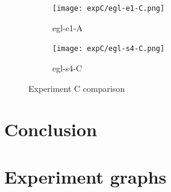 \documentclass[twoside]{ctuthesis}
\theoremstyle{plain}
\theoremstyle{definition}
\theoremstyle{note}
\begin{document}
\begin{figure}[htbp]
	\label{f:fff}
	\centering
	\begin{subfigure}{0.49\textwidth}
		\centering
		\texttt{[image: expC/egl-e1-C.png]}
		\caption{egl-e1-A}
	\end{subfigure}
	\hfill
	\begin{subfigure}{0.49\textwidth}
		
		\centering
		\texttt{[image: expC/egl-s4-C.png]}
		\caption{egl-s4-C}
	\end{subfigure}
	\caption{Experiment C comparison}
\end{figure}


\chapter{Conclusion}





\appendix
\chapter{Experiment graphs}
\label{sec:appendix}
\end{document}
